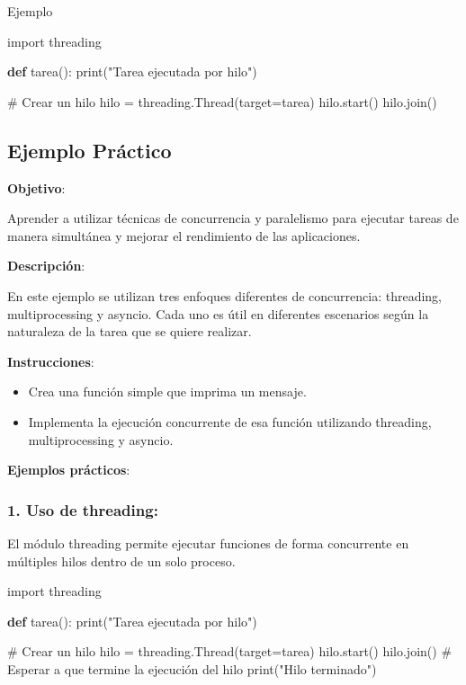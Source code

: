 \documentclass[
  a4paper,
  DIV=11,
  numbers=noendperiod,
  onepage,
  openany]{scrreprt}
\newenvironment{Shaded}{\begin{snugshade}}{\end{snugshade}}
\newcommand{\BuiltInTok}[1]{\textcolor[rgb]{0.00,0.23,0.31}{#1}}
\newcommand{\CommentTok}[1]{\textcolor[rgb]{0.37,0.37,0.37}{#1}}
\newcommand{\ImportTok}[1]{\textcolor[rgb]{0.00,0.46,0.62}{#1}}
\newcommand{\KeywordTok}[1]{\textcolor[rgb]{0.00,0.23,0.31}{\textbf{#1}}}
\newcommand{\NormalTok}[1]{\textcolor[rgb]{0.00,0.23,0.31}{#1}}
\newcommand{\OperatorTok}[1]{\textcolor[rgb]{0.37,0.37,0.37}{#1}}
\newcommand{\StringTok}[1]{\textcolor[rgb]{0.13,0.47,0.30}{#1}}
\begin{document}
Ejemplo

\begin{Shaded}
\begin{Highlighting}[]
\ImportTok{import}\NormalTok{ threading}

\KeywordTok{def}\NormalTok{ tarea():}
    \BuiltInTok{print}\NormalTok{(}\StringTok{"Tarea ejecutada por hilo"}\NormalTok{)}

\CommentTok{\# Crear un hilo}
\NormalTok{hilo }\OperatorTok{=}\NormalTok{ threading.Thread(target}\OperatorTok{=}\NormalTok{tarea)}
\NormalTok{hilo.start()}
\NormalTok{hilo.join()}
\end{Highlighting}
\end{Shaded}

\subsection{Ejemplo Práctico}\label{ejemplo-pruxe1ctico-9}

\textbf{Objetivo}:

Aprender a utilizar técnicas de concurrencia y paralelismo para ejecutar
tareas de manera simultánea y mejorar el rendimiento de las
aplicaciones.

\textbf{Descripción}:

En este ejemplo se utilizan tres enfoques diferentes de concurrencia:
threading, multiprocessing y asyncio. Cada uno es útil en diferentes
escenarios según la naturaleza de la tarea que se quiere realizar.

\textbf{Instrucciones}:

\begin{itemize}
\item
  Crea una función simple que imprima un mensaje.
\item
  Implementa la ejecución concurrente de esa función utilizando
  threading, multiprocessing y asyncio.
\end{itemize}

\textbf{Ejemplos prácticos}:

\subsubsection{1. Uso de threading:}\label{uso-de-threading}

El módulo threading permite ejecutar funciones de forma concurrente en
múltiples hilos dentro de un solo proceso.

\begin{Shaded}
\begin{Highlighting}[]
\ImportTok{import}\NormalTok{ threading}

\KeywordTok{def}\NormalTok{ tarea():}
    \BuiltInTok{print}\NormalTok{(}\StringTok{"Tarea ejecutada por hilo"}\NormalTok{)}

\CommentTok{\# Crear un hilo}
\NormalTok{hilo }\OperatorTok{=}\NormalTok{ threading.Thread(target}\OperatorTok{=}\NormalTok{tarea)}
\NormalTok{hilo.start()}
\NormalTok{hilo.join()  }\CommentTok{\# Esperar a que termine la ejecución del hilo}
\BuiltInTok{print}\NormalTok{(}\StringTok{"Hilo terminado"}\NormalTok{)}
\end{Highlighting}
\end{Shaded}
\end{document}
